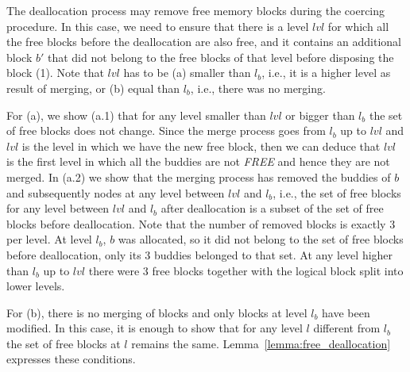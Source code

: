 The deallocation process may remove free memory blocks during the coercing procedure. In this case, we need to ensure that there is a level $lvl$ for which all the free blocks before the deallocation are also free, and it contains an additional block $b'$ that did not belong to the free blocks of that level before disposing the block (1). Note that $lvl$ has to be (a) smaller than $l_b$, i.e., it is a higher level as result of merging, or (b) equal than $l_b$, i.e., there was no merging.

For (a), we show (a.1) that for any level smaller than $lvl$ or bigger than $l_b$ the set of free blocks does not change. Since the merge process goes from $l_b$ up to $lvl$ and  $lvl$ is the level in which we have the new free block, then we can deduce that $lvl$ is the first level in which all the buddies are not \emph{FREE} and hence they are not merged. In (a.2) we show that the merging process has removed the buddies of $b$ and subsequently nodes at any level between $lvl$ and $l_b$, i.e., the set of free blocks for any level between $lvl$ and $l_b$ after deallocation is a subset of the set of free blocks before deallocation. Note that the number of removed blocks is exactly 3 per level. At level $l_b$, $b$ was allocated, so it did not belong to the set of free blocks before deallocation, only its 3 buddies belonged to that set. At any level higher than $l_b$ up to $lvl$ there were 3 free blocks together with the logical block split into lower levels.

For (b), there is no merging of blocks and only blocks at level $l_b$ have been modified. In this case, it is enough to show that for any level $l$ different from $l_b$ the set of free blocks at $l$ remains the same. Lemma~\ref{lemma:free_deallocation} expresses these conditions.

